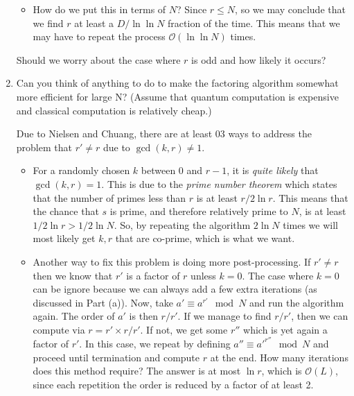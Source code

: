 \documentclass{article}
\theoremstyle{definition}
\begin{document}
\begin{enumerate}[label=(\alph*)]
\begin{itemize}
	\item How do we put this in terms of $N$? Since $ r \leq N$, so we may conclude that we find $r$ at least a $D/\ln \ln N$ fraction of the time. This means that we may have to repeat the process $\boxed{\mathcal{O}(\ln \ln N)}$ times.   
\end{itemize}
Should we worry about the case where $r$ is odd and how likely it occurs? 

    




\item Can you think of anything to do to make the factoring algorithm somewhat more efficient for large N? (Assume that quantum computation is expensive and classical computation is relatively cheap.)

\noindent Due to Nielsen and Chuang, there are at least 03 ways to address the problem that $r'\neq r$ due to $\gcd(k,r)\neq 1$. 
\begin{itemize}
	\item For a randomly chosen $k$ between $0$ and $r-1$, it is \textit{quite likely} that $\gcd(k,r) = 1$. This is due to the \textit{prime number theorem} which states that the number of primes less than $r$ is at least $r/2\ln r$. This means that the chance that $s$ is prime, and therefore relatively prime to $N$, is at least $1/2\ln r > 1/2 \ln N$. So, by repeating the algorithm $\boxed{2\ln N}$ times we will most likely get $k,r$ that are co-prime, which is what we want.
	
	\item Another way to fix this problem is doing more post-processing. If $r' \neq r$ then we know that $r'$ is a factor of $r$ unless $k=0$. The case where $k=0$ can be ignore because we can always add a few extra iterations (as discussed in Part (a)).  Now, take $a' \equiv a^{r'} \mod N$ and run the algorithm again. The order of $a'$ is then $r/r'$. If we manage to find $r/r'$, then we can compute via $r = r' \times r/r'$. If not, we get some $r''$ which is yet again a factor of $r'$. In this case, we repeat by defining $a'' \equiv a'^{r''}\mod N$ and proceed until termination and compute $r$ at the end. How many iterations does this method require? The answer is at most $\ln r$, which is $\boxed{\mathcal{O}(L)}$, since each repetition the order is reduced by a factor of at least 2. 
	

\end{itemize}
\end{enumerate}
\end{document}
